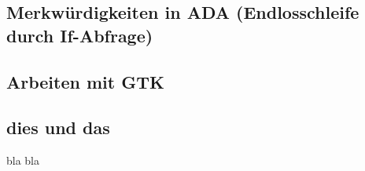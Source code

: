 \documentclass[12pt,a4paper,bibliography=totocnumbered,listof=totocnumbered]{scrartcl}
\begin{document}
\subsection{Merkwürdigkeiten in ADA (Endlosschleife durch If-Abfrage)}

\subsection{Arbeiten mit GTK}








\subsection{dies und das}
bla bla

\pagebreak



\renewcommand\refname{Quellenverzeichnis}

%
%

\pagebreak

\setcounter{page}{1}
\end{document}
